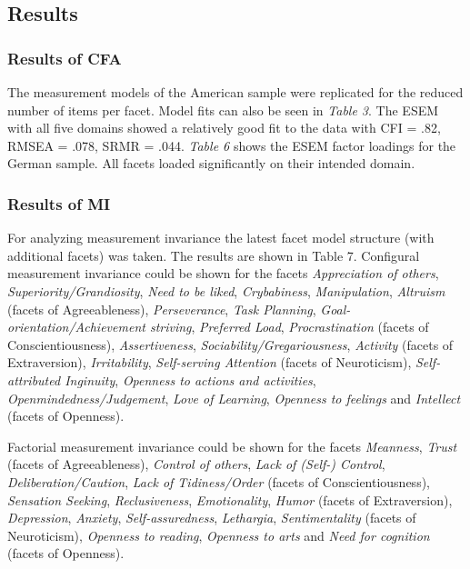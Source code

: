 \documentclass[,man,floatsintext]{apa6}
\begin{document}
\subsection{Results}\label{results-1}

\subsubsection{Results of CFA}\label{results-of-cfa}

The measurement models of the American sample were replicated for the
reduced number of items per facet. Model fits can also be seen in
\emph{Table 3}. The ESEM with all five domains showed a relatively good
fit to the data with CFI = .82, RMSEA = .078, SRMR = .044. \emph{Table
6} shows the ESEM factor loadings for the German sample. All facets
loaded significantly on their intended domain.

\vspace{5mm}

\vspace{5mm}

\subsubsection{Results of MI}\label{results-of-mi}

For analyzing measurement invariance the latest facet model structure
(with additional facets) was taken. The results are shown in Table 7.
Configural measurement invariance could be shown for the facets
\emph{Appreciation of others}, \emph{Superiority/Grandiosity},
\emph{Need to be liked}, \emph{Crybabiness}, \emph{Manipulation},
\emph{Altruism} (facets of Agreeableness), \emph{Perseverance},
\emph{Task Planning}, \emph{Goal-orientation/Achievement striving},
\emph{Preferred Load}, \emph{Procrastination} (facets of
Conscientiousness), \emph{Assertiveness},
\emph{Sociability/Gregariousness}, \emph{Activity} (facets of
Extraversion), \emph{Irritability}, \emph{Self-serving Attention}
(facets of Neuroticism), \emph{Self-attributed Inginuity},
\emph{Openness to actions and activities},
\emph{Openmindedness/Judgement}, \emph{Love of Learning}, \emph{Openness
to feelings} and \emph{Intellect} (facets of Openness).

Factorial measurement invariance could be shown for the facets
\emph{Meanness}, \emph{Trust} (facets of Agreeableness), \emph{Control
of others}, \emph{Lack of (Self-) Control}, \emph{Deliberation/Caution},
\emph{Lack of Tidiness/Order} (facets of Conscientiousness),
\emph{Sensation Seeking}, \emph{Reclusiveness}, \emph{Emotionality},
\emph{Humor} (facets of Extraversion), \emph{Depression},
\emph{Anxiety}, \emph{Self-assuredness}, \emph{Lethargia},
\emph{Sentimentality} (facets of Neuroticism), \emph{Openness to
reading}, \emph{Openness to arts} and \emph{Need for cognition} (facets
of Openness).
\end{document}
